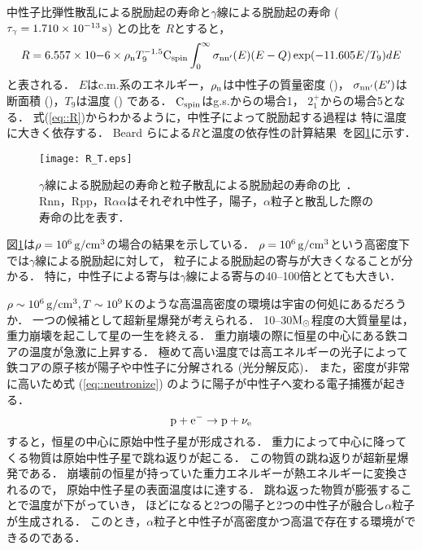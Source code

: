 \documentclass[../master]{subfiles}
\begin{document}
中性子比弾性散乱による脱励起の寿命と$\gamma$線による脱励起の寿命 ($\tau_{\gamma} = \SIU{1.710e-13}{\second}$) との比を
$R$とすると，
\begin{equation}
  R = 6.557\times10{-6}\times\rho_{\rm n}T_{9}^{-1.5}{\rm C}_{{\rm spin}}
  \int^{\infty}_{0}\sigma_{\rm nn'}(E)(E-Q)\exp(-11.605E/T_{9})dE
  \label{eq::R}
\end{equation}
と表される．
$E$はc.m.系のエネルギー，$\rho_{\rm n}$は中性子の質量密度 (\siu{\gram\per\cubic\centi\metre})，
$\sigma_{\rm nn'}(E')$は断面積 (\siu{\milli\barn})，$T_{9}$は温度 () である．
${\rm C}_{{\rm spin}}$はg.s.からの場合1，
$2_{1}^{+}$からの場合5となる．
式(\ref{eq::R})からわかるように，中性子によって脱励起する過程は
特に温度に大きく依存する．
Beard らによる$R$と温度の依存性の計算結果~\cite{hotdensemedium}を図\ref{fig::R}に示す．
\begin{figure}
  \centering
  \texttt{[image: R\_T.eps]}
  \caption[$\gamma$線による脱励起の寿命と粒子散乱による脱励起の寿命の比．]
          {$\gamma$線による脱励起の寿命と粒子散乱による脱励起の寿命の比~\cite{hotdensemedium}．
    Rnn，Rpp，R$\alpha\alpha$はそれぞれ中性子，陽子，$\alpha$粒子と散乱した際の寿命の比を表す．}
  \label{fig::R}
\end{figure}
図\ref{fig::R}は$\rho = \SIU{e6}{\gram\per\cubic\centi\metre}$の場合の結果を示している．
$\rho = \SIU{e6}{\gram\per\cubic\centi\metre}$という高密度下では$\gamma$線による脱励起に対して，
粒子による脱励起の寄与が大きくなることが分かる．
特に，中性子による寄与は$\gamma$線による寄与の40--100倍ととても大きい．

$\rho\sim\SIU{e6}{\gram\per\cubic\centi\metre}, T\sim\SIU{e9}{\kelvin}$のような高温高密度の環境は宇宙の何処にあるだろうか．
一つの候補として超新星爆発が考えられる．
10--30$\rm M_{\odot}$程度の大質量星は，重力崩壊を起こして星の一生を終える．
重力崩壊の際に恒星の中心にある鉄コアの温度が急激に上昇する．
極めて高い温度では高エネルギーの光子によって鉄コアの原子核が陽子や中性子に分解される (光分解反応)．
また，密度が非常に高いため式 (\ref{eq::neutronize}) のように陽子が中性子へ変わる電子捕獲が起きる．
\begin{equation}
  {\rm p}+{\rm e}^{-} \rightarrow {\rm p}+\nu_{\rm e}
  \label{eq::neutronize}
\end{equation}
すると，恒星の中心に原始中性子星が形成される．
重力によって中心に降ってくる物質は原始中性子星で跳ね返りが起こる．
この物質の跳ね返りが超新星爆発である．
崩壊前の恒星が持っていた重力エネルギーが熱エネルギーに変換されるので，
原始中性子星の表面温度はに達する．
跳ね返った物質が膨張することで温度が下がっていき，
ほどになると2つの陽子と2つの中性子が融合し$\alpha$粒子が生成される．
このとき，$\alpha$粒子と中性子が高密度かつ高温で存在する環境ができるのである．
\end{document}
